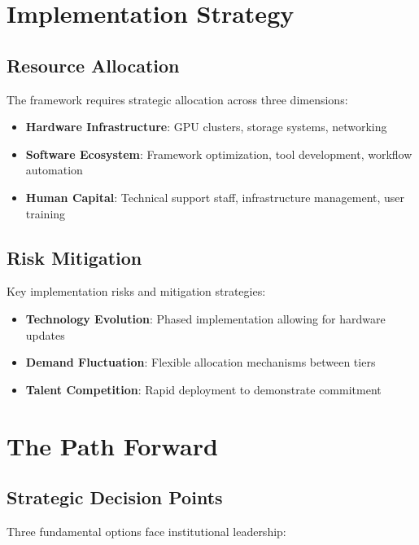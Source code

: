 \documentclass{article}
\begin{document}
\section{Implementation Strategy}

\subsection{Resource Allocation}

The framework requires strategic allocation across three dimensions:

\begin{itemize}
\item \textbf{Hardware Infrastructure}: GPU clusters, storage systems, networking
\item \textbf{Software Ecosystem}: Framework optimization, tool development, workflow automation
\item \textbf{Human Capital}: Technical support staff, infrastructure management, user training
\end{itemize}

\subsection{Risk Mitigation}

Key implementation risks and mitigation strategies:

\begin{itemize}
\item \textbf{Technology Evolution}: Phased implementation allowing for hardware updates
\item \textbf{Demand Fluctuation}: Flexible allocation mechanisms between tiers
\item \textbf{Talent Competition}: Rapid deployment to demonstrate commitment
\end{itemize}

\section{The Path Forward}

\subsection{Strategic Decision Points}

Three fundamental options face institutional leadership:
\end{document}
